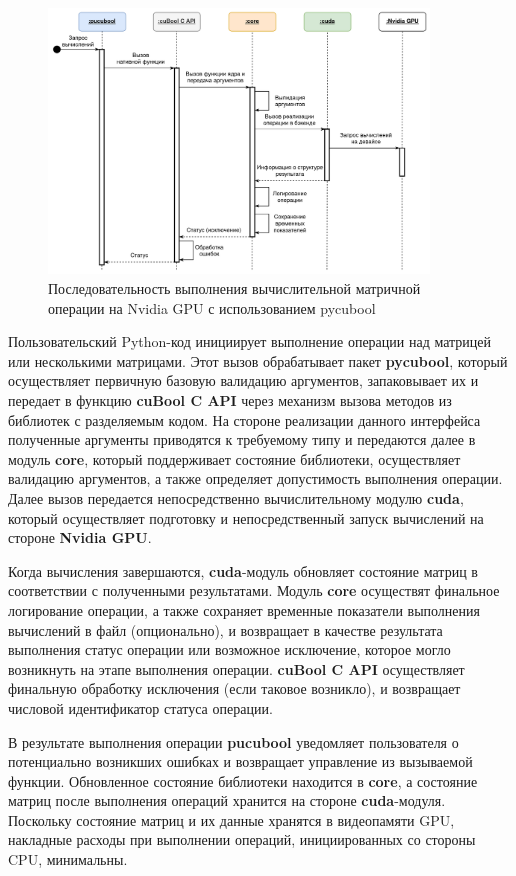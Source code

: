 \begin{figure}[h]
    \centering
    \includegraphics[width=0.9\textwidth]{images/library_sequence_use.png}
    \caption{Последовательность выполнения вычислительной матричной операции на Nvidia GPU с использованием pycubool}
    \label{fig:cubool_sequence}
\end{figure}

Пользовательский Python-код инициирует выполнение операции над матрицей или несколькими матрицами.
Этот вызов обрабатывает пакет \textbf{pycubool}, который осуществляет первичную базовую валидацию аргументов, запаковывает их и передает в функцию \textbf{cuBool C API} через механизм вызова методов из библиотек с разделяемым кодом.
На стороне реализации данного интерфейса полученные аргументы приводятся к требуемому типу и передаются далее в модуль \textbf{core}, 
который поддерживает состояние библиотеки, 
осуществляет валидацию аргументов, а также определяет допустимость выполнения операции. 
Далее вызов передается непосредственно вычислительному модулю \textbf{cuda}, 
который осуществляет подготовку и непосредственный запуск вычислений на стороне \textbf{Nvidia GPU}. 

Когда вычисления завершаются, \textbf{cuda}-модуль обновляет состояние матриц в соответствии с полученными результатами. 
Модуль \textbf{core} осуществят финальное логирование операции, 
а также сохраняет временные показатели выполнения вычислений в файл (опционально), 
и возвращает в качестве результата выполнения статус операции или возможное исключение, 
которое могло возникнуть на этапе выполнения операции. 
\textbf{cuBool C API} осуществляет финальную обработку исключения (если таковое возникло), 
и возвращает числовой идентификатор статуса операции. 

В результате выполнения операции \textbf{pucubool} уведомляет пользователя о потенциально возникших ошибках и возвращает управление из вызываемой функции. 
Обновленное состояние библиотеки находится в \textbf{core}, а состояние матриц после выполнения операций хранится на стороне \textbf{cuda}-модуля. Поскольку состояние матриц и их данные хранятся в видеопамяти GPU, накладные расходы при выполнении операций, инициированных со стороны CPU, минимальны.  